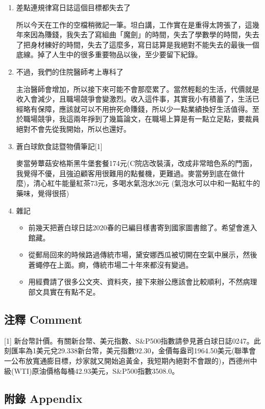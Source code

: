 \documentclass[
]{article}
\providecommand{\tightlist}{%
  \setlength{\itemsep}{0pt}\setlength{\parskip}{0pt}}
\begin{document}
\begin{enumerate}
\def\labelenumi{\arabic{enumi}.}
\item
  差點連規律寫日誌這個目標都失去了

  所以今天在工作的空檔稍微記一筆。坦白講，工作實在是重得太誇張了，這幾年來因為賺錢，我失去了寫組曲「魔劍」的時間，失去了學數學的時間，失去了把身材練好的時間，失去了這麼多，寫日誌算是我絕對不能失去的最後一個底線。掉了人生中的很多重要物品以後，至少要留下紀錄。
\item
  不過，我們的住院醫師考上專科了

  主治醫師會增加，所以接下來可能不會那麼累了。當然輕鬆的生活，代價就是收入會減少，且職場競爭會變激烈。收入這件事，其實我小有積蓄了，生活已經略有保障，應該就可以不用拚死命賺錢，所以少一點業績換好生活值得。至於職場競爭，我這兩年掙到了幾篇論文，在職場上算是有一點立足點，要裁員絕對不會先從我開始，所以也還好。
\item
  蒼白球飲食誌暨物價筆記{[}1{]}

  麥當勞蕈菇安格斯黑牛堡套餐174元(C院店改裝潢，改成非常暗色系的門面，我覺得不優，且強迫顧客用很難用的點餐機，更難過。麥當勞到底在做什麼)，清心紅牛能量紅茶73元，多喝水氣泡水26元
  (氣泡水可以中和一點紅牛的藥味，覺得很搭)
\item
  雜記

  \begin{itemize}
  \tightlist
  \item
    前幾天把蒼白球日誌2020春的已編目樣書寄到國家圖書館了。希望會進入館藏。
  \item
    從郵局回來的時候路過傳統市場，黛安娜西瓜被切開在空氣中展示，然後蒼蠅停在上面。痾，傳統市場二十年來都沒有變過。
  \item
    用經費請了很多公文夾、資料夾，接下來辦公應該會比較順利，不然病理部文具實在有點不足。
  \end{itemize}
\end{enumerate}

\hypertarget{ux6ce8ux91cb-comment-29}{%
\subsection{注釋 Comment}\label{ux6ce8ux91cb-comment-29}}

{[}1{]}
新台幣計價。有關新台幣、美元指數、S\&P500指數請參見蒼白球日誌0247。此刻匯率為1美元兌29.338新台幣，美元指數92.30，金價每盎司1964.50美元(聯準會一公布放寬通膨目標，炒家就又開始追黃金，我短期內絕對不會跟的)，西德州中級(WTI)原油價格每桶42.93美元，S\&P500指數3508.0。

\hypertarget{ux9644ux9304-appendix-29}{%
\subsection{附錄 Appendix}\label{ux9644ux9304-appendix-29}}
\end{document}
